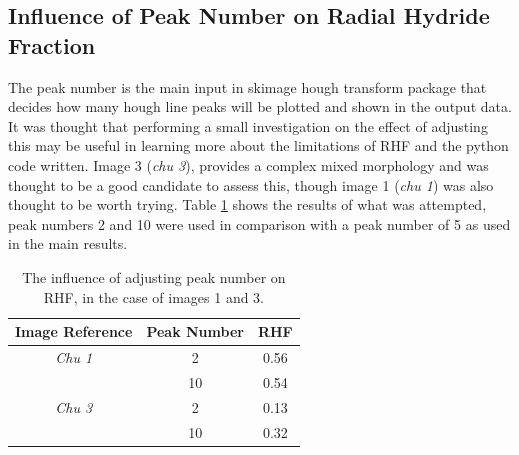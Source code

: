 \documentclass{article}
\begin{document}
\subsection{Influence of Peak Number on Radial Hydride Fraction}

    The peak number is the main input in skimage hough transform package that decides how many hough line peaks will be plotted and shown in the output data. It was thought that performing a small investigation on the effect of adjusting this may be useful in learning more about the limitations of RHF and the python code written. Image 3 (\textit{chu 3}), provides a complex mixed morphology and was thought to be a good candidate to assess this, though image 1 (\textit{chu 1}) was also thought to be worth trying. Table \ref{tab:peakno_tests} shows the results of what was attempted, peak numbers 2 and 10 were used in comparison with a peak number of 5 as used in the main results.

    \begin{table}[h]
        \centering
        \begin{tabular}{|c|c|c|}
        \hline
        \multicolumn{1}{|l|}{\textbf{Image Reference}} & \textbf{Peak Number} & \textbf{RHF} \\ \hline
        \multirow{}{}{\textit{Chu 1}}                & 2                    & 0.56         \\ 
                                                      & 10                   & 0.54         \\ \hline
        \multirow{}{}{\textit{Chu 3}}                & 2                    & 0.13         \\ 
                                                      & 10                   & 0.32         \\ \hline
        \end{tabular}
        \caption{The influence of adjusting peak number on RHF, in the case of images 1 and 3.}
        \label{tab:peakno_tests}
    \end{table}
    
\end{document}
